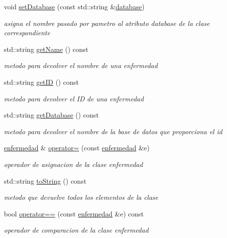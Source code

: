 \begin{DoxyCompactItemize}
void \hyperlink{classenfermedad_a0692aeddbe73abda6dc53e41f30d913b}{set\+Database} (const std\+::string \&\hyperlink{classenfermedad_a4c33267847aebecf5bd7eb52b78e5da5}{database})
\begin{DoxyCompactList}\small\item\em asigna el nombre pasado por pametro al atributo database de la clase correspondiente \end{DoxyCompactList}\item 
std\+::string \hyperlink{classenfermedad_a9af7f284317318b3a9503ae5677a2108}{get\+Name} () const 
\begin{DoxyCompactList}\small\item\em metodo para devolver el nombre de una enfermedad \end{DoxyCompactList}\item 
std\+::string \hyperlink{classenfermedad_a8bba86bd2de2f9d458ab83ade81b7102}{get\+ID} () const 
\begin{DoxyCompactList}\small\item\em metodo para devolver el ID de una enfermedad \end{DoxyCompactList}\item 
std\+::string \hyperlink{classenfermedad_aed4ce155695818e0c424d4c16e0a35be}{get\+Database} () const 
\begin{DoxyCompactList}\small\item\em metodo para devolver el nombre de la base de datos que proporciona el id \end{DoxyCompactList}\item 
\hyperlink{classenfermedad}{enfermedad} \& \hyperlink{classenfermedad_a795be16b7e3e6a858211ff20a62c9d85}{operator=} (const \hyperlink{classenfermedad}{enfermedad} \&e)
\begin{DoxyCompactList}\small\item\em operador de asignacion de la clase enfermedad \end{DoxyCompactList}\item 
std\+::string \hyperlink{classenfermedad_a340ca8d77c33a0d0284a9100a3f50be6}{to\+String} () const 
\begin{DoxyCompactList}\small\item\em metodo que devuelve todos los elementos de la clase \end{DoxyCompactList}\item 
bool \hyperlink{classenfermedad_ac2786ad7be914729516dd15611532fbb}{operator==} (const \hyperlink{classenfermedad}{enfermedad} \&e) const 
\begin{DoxyCompactList}\small\item\em operador de comparacion de la clase enfermedad \end{DoxyCompactList}\item 

\end{DoxyCompactItemize}
